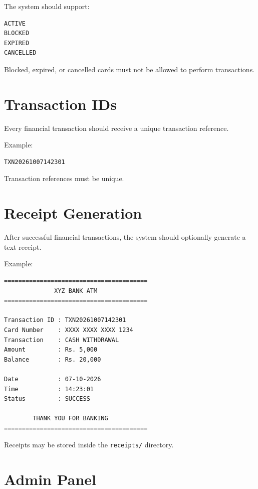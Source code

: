 \documentclass[12pt,a4paper]{article}
\begin{document}
The system should support:

\begin{verbatim}
ACTIVE
BLOCKED
EXPIRED
CANCELLED
\end{verbatim}

Blocked, expired, or cancelled cards must not be allowed to perform
transactions.


\section{Transaction IDs}

Every financial transaction should receive a unique transaction
reference.

Example:

\begin{verbatim}
TXN20261007142301
\end{verbatim}

Transaction references must be unique.


\section{Receipt Generation}

After successful financial transactions, the system should optionally
generate a text receipt.

Example:

\begin{verbatim}
========================================
              XYZ BANK ATM
========================================

Transaction ID : TXN20261007142301
Card Number    : XXXX XXXX XXXX 1234
Transaction    : CASH WITHDRAWAL
Amount         : Rs. 5,000
Balance        : Rs. 20,000

Date           : 07-10-2026
Time           : 14:23:01
Status         : SUCCESS

        THANK YOU FOR BANKING
========================================
\end{verbatim}

Receipts may be stored inside the \texttt{receipts/} directory.


\section{Admin Panel}
\end{document}
